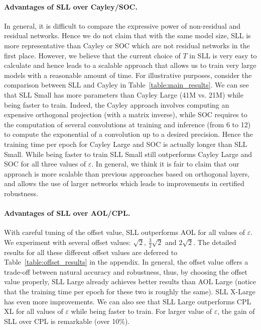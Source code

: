 \documentclass{article} \usepackage{iclr2023_conference,times}
\newcommand{\0}{\mathbf{0} }
\begin{document}
\paragraph{Advantages of SLL over Cayley/SOC.} In general, it is difficult to compare the expressive power of non-residual and residual networks.
Hence we do not claim that with the same model size, SLL is more representative than Cayley or SOC which are not residual networks in the first place.
However, we believe that the current choice of $T$ in SLL is very easy to calculate and hence leads to a scalable approach that allows us to train very large models with a reasonable amount of time.
For illustrative purposes, consider the comparison between SLL and Cayley in Table~\ref{table:main_results}.
We can see that SLL Small has more parameters than Cayley Large (41M vs. 21M) while being faster to train.
Indeed, the Cayley approach involves computing an expensive orthogonal projection (with a matrix inverse), while SOC requires to the computation of several convolutions at training and inference (from 6 to 12) to compute the exponential of a convolution up to a desired precision.
Hence the training time per epoch for Cayley Large and SOC is actually longer than SLL Small.
While being faster to train SLL Small still outperforms Cayley Large and SOC for all three values of $\varepsilon$.
In general, we think it is fair to claim that our approach is more scalable than previous approaches based on orthogonal layers, and allows the use of larger networks which leads to improvements in certified robustness. 

\vspace{-0.0cm}
\paragraph{Advantages of SLL over AOL/CPL.} 
With careful tuning of the offset value, SLL outperforms AOL for all values of $\varepsilon$. 
We experiment with several offset values: $\sqrt{2}$, $\frac32 \sqrt{2}$ and $2\sqrt{2}$. The detailed results for all these different offset values are deferred to Table~\ref{table:offset_results} in the appendix.
In general, the offset value offers a trade-off between natural accuracy and robustness, thus, by choosing the offset value properly, SLL Large already achieves better results than AOL Large (notice that the training time per epoch for these two is roughly the same). SLL X-Large has even more improvements.
We can also see that SLL Large outperforms CPL XL for all values of $\varepsilon$ while being faster to train. 
For larger value of $\varepsilon$, the gain of SLL over CPL is remarkable (over 10\%).
\end{document}
